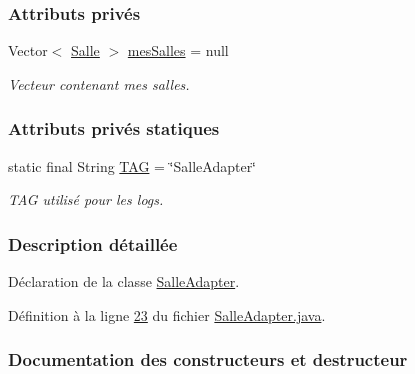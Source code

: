 \subsubsection*{Attributs privés}
\begin{DoxyCompactItemize}
\item 
Vector$<$ \hyperlink{classcom_1_1lasalle_1_1meeting_1_1_salle}{Salle} $>$ \hyperlink{classcom_1_1lasalle_1_1meeting_1_1_salle_adapter_a3988ff211fbf3052b553d77ba0711a5a}{mes\+Salles} = null
\begin{DoxyCompactList}\small\item\em Vecteur contenant mes salles. \end{DoxyCompactList}\end{DoxyCompactItemize}
\subsubsection*{Attributs privés statiques}
\begin{DoxyCompactItemize}
\item 
static final String \hyperlink{classcom_1_1lasalle_1_1meeting_1_1_salle_adapter_a774947591a1beedaffd58989783206b1}{T\+AG} = \char`\"{}Salle\+Adapter\char`\"{}
\begin{DoxyCompactList}\small\item\em T\+AG utilisé pour les logs. \end{DoxyCompactList}\end{DoxyCompactItemize}


\subsubsection{Description détaillée}
Déclaration de la classe \hyperlink{classcom_1_1lasalle_1_1meeting_1_1_salle_adapter}{Salle\+Adapter}. 

Définition à la ligne \hyperlink{_salle_adapter_8java_source_l00023}{23} du fichier \hyperlink{_salle_adapter_8java_source}{Salle\+Adapter.\+java}.



\subsubsection{Documentation des constructeurs et destructeur}
\mbox{\label{classcom_1_1lasalle_1_1meeting_1_1_salle_adapter_aac5caf27dc7448e1f37868066b3c9d00}} 
